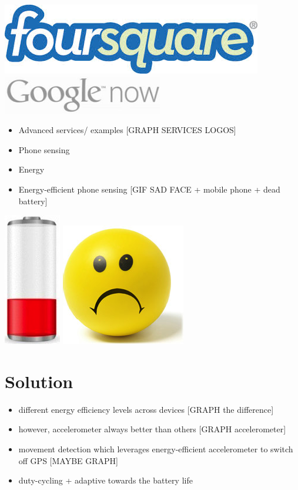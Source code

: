 \documentclass[a2,landscape]{a0poster}
\begin{document}
\includegraphics[scale=0.5]{plots/logo_foursquare}
\includegraphics[scale=0.7]{plots/logo_google_now}
		
\begin{itemize}
   \item Advanced services/ examples [GRAPH SERVICES LOGOS]
   \item Phone sensing
   \item Energy
   \item Energy-efficient phone sensing [GIF SAD FACE + mobile phone + dead battery]
  \end{itemize}
  
\includegraphics[scale=0.7]{plots/low_battery}
\includegraphics[scale=0.7]{plots/sad_face}

\mbox{}\framebreak
\section*{Solution}
\begin{itemize}
   \item different energy efficiency levels across devices [GRAPH the difference]
   \item however, accelerometer always better than others [GRAPH accelerometer]
   \item movement detection which leverages energy-efficient accelerometer to switch off GPS [MAYBE GRAPH]
   \item duty-cycling + adaptive towards the battery life
  \end{itemize}
\end{document}
